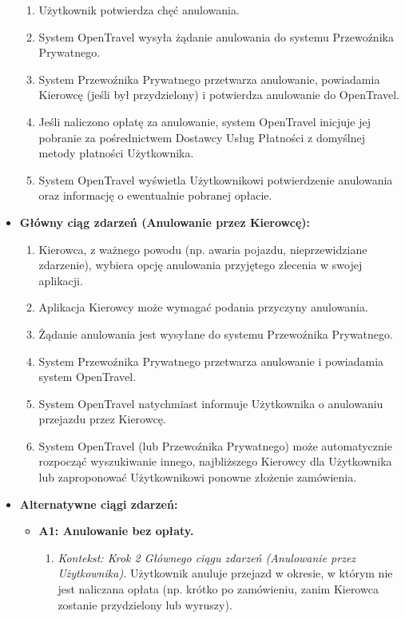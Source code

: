 \documentclass[a4paper,12pt]{article}
\begin{document}
\begin{itemize}
\begin{enumerate}
            \item Użytkownik potwierdza chęć anulowania.
            \item System OpenTravel wysyła żądanie anulowania do systemu Przewoźnika Prywatnego.
            \item System Przewoźnika Prywatnego przetwarza anulowanie, powiadamia Kierowcę (jeśli był przydzielony) i potwierdza anulowanie do OpenTravel.
            \item Jeśli naliczono opłatę za anulowanie, system OpenTravel inicjuje jej pobranie za pośrednictwem Dostawcy Usług Płatności z domyślnej metody płatności Użytkownika.
            \item System OpenTravel wyświetla Użytkownikowi potwierdzenie anulowania oraz informację o ewentualnie pobranej opłacie.
        \end{enumerate}
    \item \textbf{Główny ciąg zdarzeń (Anulowanie przez Kierowcę):}
        \begin{enumerate}
            \item Kierowca, z ważnego powodu (np. awaria pojazdu, nieprzewidziane zdarzenie), wybiera opcję anulowania przyjętego zlecenia w swojej aplikacji.
            \item Aplikacja Kierowcy może wymagać podania przyczyny anulowania.
            \item Żądanie anulowania jest wysyłane do systemu Przewoźnika Prywatnego.
            \item System Przewoźnika Prywatnego przetwarza anulowanie i powiadamia system OpenTravel.
            \item System OpenTravel natychmiast informuje Użytkownika o anulowaniu przejazdu przez Kierowcę.
            \item System OpenTravel (lub Przewoźnika Prywatnego) może automatycznie rozpocząć wyszukiwanie innego, najbliższego Kierowcy dla Użytkownika lub zaproponować Użytkownikowi ponowne złożenie zamówienia.
        \end{enumerate}
    \item \textbf{Alternatywne ciągi zdarzeń:}
        \begin{itemize}
            \item \textbf{A1: Anulowanie bez opłaty.}
                \begin{enumerate}
                    \item \textit{Kontekst: Krok 2 Głównego ciągu zdarzeń (Anulowanie przez Użytkownika).} Użytkownik anuluje przejazd w okresie, w którym nie jest naliczana opłata (np. krótko po zamówieniu, zanim Kierowca zostanie przydzielony lub wyruszy).

\end{enumerate}
\end{itemize}
\end{itemize}
\end{document}
